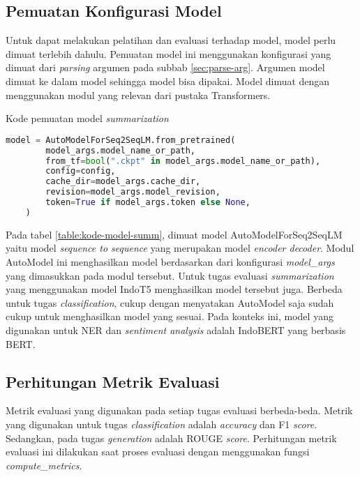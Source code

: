 \subsection{Pemuatan Konfigurasi Model}

Untuk dapat melakukan pelatihan dan evaluasi terhadap model, model perlu dimuat terlebih dahulu. Pemuatan model ini menggunakan konfigurasi yang dimuat dari \textit{parsing} argumen pada subbab \ref{sec:parse-arg}. Argumen model  dimuat ke dalam model sehingga model bisa dipakai. Model  dimuat dengan menggunakan modul yang relevan dari pustaka Transformers.

\begin{table}[h]
    \caption{Kode pemuatan model \textit{summarization}}
    \label{table:kode-model-summ}
    \begin{lstlisting}[language=python]
    model = AutoModelForSeq2SeqLM.from_pretrained(
        model_args.model_name_or_path,
        from_tf=bool(".ckpt" in model_args.model_name_or_path),
        config=config,
        cache_dir=model_args.cache_dir,
        revision=model_args.model_revision,
        token=True if model_args.token else None,
    )
    \end{lstlisting}
\end{table}

Pada tabel \ref{table:kode-model-summ}, dimuat model AutoModelForSeq2SeqLM yaitu model \textit{sequence to sequence} yang merupakan model \textit{encoder decoder}. Modul AutoModel ini  menghasilkan model berdasarkan dari konfigurasi \textit{model\_args} yang dimasukkan pada modul tersebut. Untuk tugas evaluasi \textit{summarization} yang menggunakan model IndoT5  menghasilkan model tersebut juga. Berbeda untuk tugas \textit{classification}, cukup dengan menyatakan AutoModel saja sudah cukup untuk menghasilkan model yang sesuai. Pada konteks ini, model yang digunakan untuk NER dan \textit{sentiment analysis} adalah IndoBERT yang berbasis BERT.

\subsection{Perhitungan Metrik Evaluasi}
\label{sec:metriks-evaluasi}

Metrik evaluasi yang digunakan pada setiap tugas evaluasi berbeda-beda. Metrik yang digunakan untuk tugas \textit{classification} adalah \textit{accuracy} dan F1 \textit{score}. Sedangkan, pada tugas \textit{generation} adalah ROUGE \textit{score}. Perhitungan metrik evaluasi ini dilakukan saat proses evaluasi dengan menggunakan fungsi \textit{compute\_metrics}.

